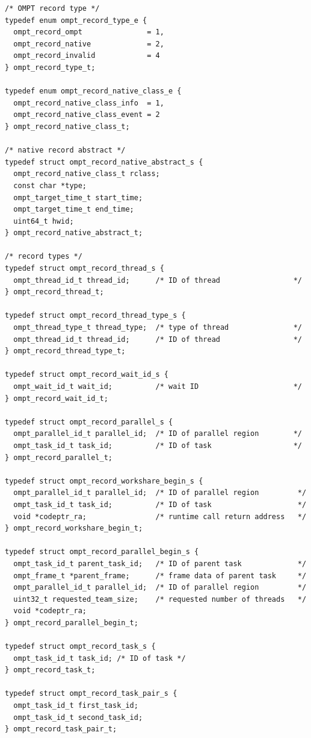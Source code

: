 \documentclass{article}
\begin{document}
\begin{verbatim}
/* OMPT record type */
typedef enum ompt_record_type_e {
  ompt_record_ompt               = 1,
  ompt_record_native             = 2,
  ompt_record_invalid            = 4
} ompt_record_type_t; 

typedef enum ompt_record_native_class_e {
  ompt_record_native_class_info  = 1,
  ompt_record_native_class_event = 2
} ompt_record_native_class_t;

/* native record abstract */
typedef struct ompt_record_native_abstract_s {
  ompt_record_native_class_t rclass;
  const char *type;
  ompt_target_time_t start_time;
  ompt_target_time_t end_time;
  uint64_t hwid;
} ompt_record_native_abstract_t;

/* record types */
typedef struct ompt_record_thread_s {
  ompt_thread_id_t thread_id;      /* ID of thread                 */
} ompt_record_thread_t;

typedef struct ompt_record_thread_type_s {
  ompt_thread_type_t thread_type;  /* type of thread               */
  ompt_thread_id_t thread_id;      /* ID of thread                 */
} ompt_record_thread_type_t;

typedef struct ompt_record_wait_id_s {
  ompt_wait_id_t wait_id;          /* wait ID                      */
} ompt_record_wait_id_t;

typedef struct ompt_record_parallel_s {
  ompt_parallel_id_t parallel_id;  /* ID of parallel region        */
  ompt_task_id_t task_id;          /* ID of task                   */
} ompt_record_parallel_t;

typedef struct ompt_record_workshare_begin_s {
  ompt_parallel_id_t parallel_id;  /* ID of parallel region         */
  ompt_task_id_t task_id;          /* ID of task                    */
  void *codeptr_ra;                /* runtime call return address   */
} ompt_record_workshare_begin_t;

typedef struct ompt_record_parallel_begin_s {
  ompt_task_id_t parent_task_id;   /* ID of parent task             */
  ompt_frame_t *parent_frame;      /* frame data of parent task     */
  ompt_parallel_id_t parallel_id;  /* ID of parallel region         */
  uint32_t requested_team_size;    /* requested number of threads   */
  void *codeptr_ra;             
} ompt_record_parallel_begin_t;

typedef struct ompt_record_task_s {
  ompt_task_id_t task_id; /* ID of task */
} ompt_record_task_t;

typedef struct ompt_record_task_pair_s {
  ompt_task_id_t first_task_id; 
  ompt_task_id_t second_task_id;  
} ompt_record_task_pair_t;


\end{verbatim}
\end{document}
